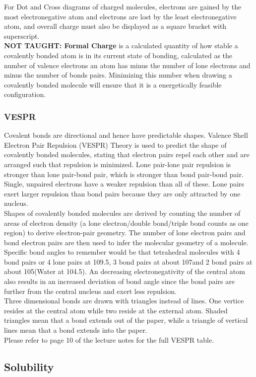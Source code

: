 \documentclass[../main]{subfiles}
\begin{document}
	For Dot and Cross diagrams of charged molecules, electrons are gained by the most electronegative atom and electrons are lost by the least electronegative atom, and overall charge must also be displayed as a square bracket with superscript. \\

	\textbf{NOT TAUGHT: Formal Charge} is a calculated quantity of how stable a covalently bonded atom is in its current state of bonding, calculated as the number of valence electrons an atom has minus the number of lone electrons and minus the number of bonds pairs. Minimizing this number when drawing a covalently bonded molecule will ensure that it is a energetically feasible configuration.

	\subsubsection{VESPR}

	Covalent bonds are directional and hence have predictable shapes. Valence Shell Electron Pair Repulsion (VESPR) Theory is used to predict the shape of covalently bonded molecules, stating that electron pairs repel each other and are arranged such that repulsion is minimized. Lone pair-lone pair repulsion is stronger than lone pair-bond pair, which is stronger than bond pair-bond pair. Single, unpaired electrons have a weaker repulsion than all of these. Lone pairs exert larger repulsion than bond pairs because they are only attracted by one nucleus. \\

	Shapes of covalently bonded molecules are derived by counting the number of areas of electron density (a lone electron/double bond/triple bond counts as one region) to derive electron-pair geometry. The number of lone electron pairs and bond electron pairs are then used to infer the molecular geometry of a molecule. \\

	Specific bond angles to remember would be that tetrahedral molecules with 4 bond pairs or 4 lone pairs at 109.5\degree, 3 bond pairs at about 107\degree and 2 bond pairs at about 105\degree (Water at 104.5\degree). An decreasing electronegativity of the central atom also results in an increased deviation of bond angle since the bond pairs are further from the central nucleus and exert less repulsion. \\

	Three dimensional bonds are drawn with triangles instead of lines. One vertice resides at the central atom while two reside at the external atom. Shaded triangles mean that a bond extends out of the paper, while a triangle of vertical lines mean that a bond extends into the paper. \\

	Please refer to page 10 of the lecture notes for the full VESPR table.

	\subsection{Solubility}
\end{document}
